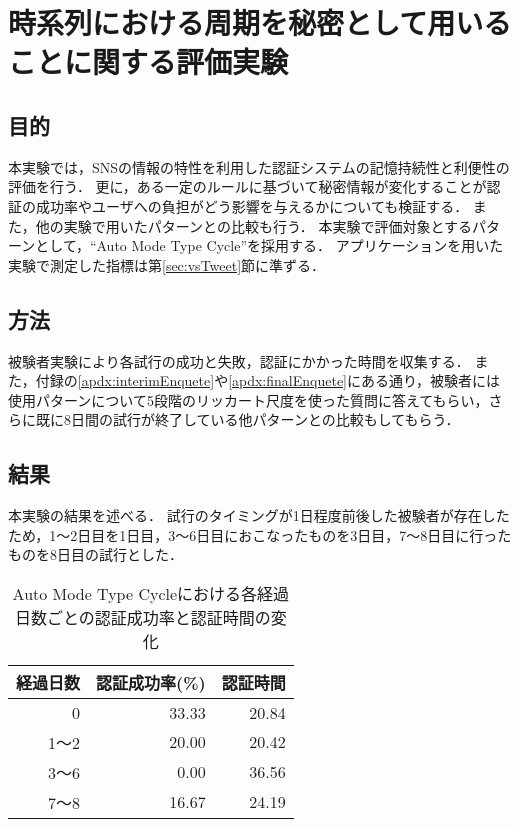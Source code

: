 \section{時系列における周期を秘密として用いることに関する評価実験}\label{sec:vsCycle}
\subsection{目的}
本実験では，SNSの情報の特性を利用した認証システムの記憶持続性と利便性の評価を行う．
更に，ある一定のルールに基づいて秘密情報が変化することが認証の成功率やユーザへの負担がどう影響を与えるかについても検証する．
また，他の実験で用いたパターンとの比較も行う．
本実験で評価対象とするパターンとして，``Auto Mode Type Cycle''を採用する．
アプリケーションを用いた実験で測定した指標は第\ref{sec:vsTweet}節に準ずる．

\subsection{方法}
被験者実験により各試行の成功と失敗，認証にかかった時間を収集する．
また，付録の\ref{apdx:interimEnquete}や\ref{apdx:finalEnquete}にある通り，被験者には使用パターンについて5段階のリッカート尺度を使った質問に答えてもらい，さらに既に8日間の試行が終了している他パターンとの比較もしてもらう．

\subsection{結果}
本実験の結果を述べる．
試行のタイミングが1日程度前後した被験者が存在したため，1〜2日目を1日目，3〜6日目におこなったものを3日目，7〜8日目に行ったものを8日目の試行とした．
\begin{table}[ht]
  \begin{center}
    \small
    \begin{tabular}{|r|r|r|} \hline
      経過日数 & 認証成功率(\%) & 認証時間\\ \hline
      0 & 33.33 & 20.84 \\
      1〜2 & 20.00 & 20.42 \\
      3〜6 & 0.00 & 36.56 \\
      7〜8 & 16.67 & 24.19 \\ \hline
    \end{tabular}
  \end{center}
  \caption{Auto Mode Type Cycleにおける各経過日数ごとの認証成功率と認証時間の変化}
  \label{tab:auto_cycle.data}
\end{table}

